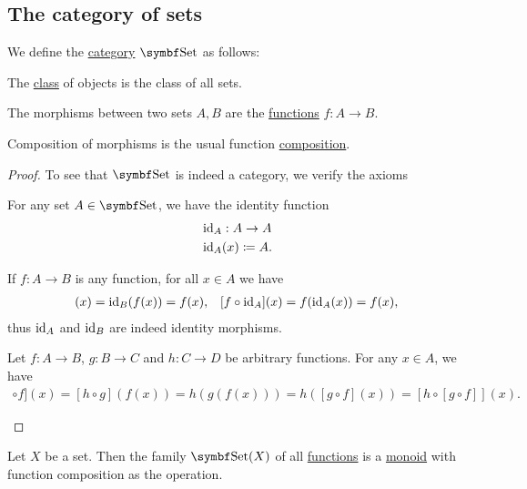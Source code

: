 \subsection{The category of sets}\label{subsec:category_of_sets}

\begin{definition}\label{def:category_of_sets}
  We define the \hyperref[def:category]{category} \( \Cat{Set} \) as follows:
  \begin{description}
     The \hyperref[def:set_zfc]{class} of objects is the class of all sets.

     The morphisms between two sets \( A, B \) are the \hyperref[def:function]{functions} \( f: A \to B \).

     Composition of morphisms is the usual function \hyperref[def:function/composition]{composition}.
  \end{description}
\end{definition}
\begin{proof}
  To see that \( \Cat{Set} \) is indeed a category, we verify the axioms
  \begin{description}
     For any set \( A \in \Cat{Set} \), we have the identity function
    \begin{align*}
      &\operatorname{id}_A: A \to A \\
      &\operatorname{id}_A(x) \coloneqq A.
    \end{align*}

    If \( f: A \to B \) is any function, for all \( x \in A \) we have
    \begin{align*}
      [\Id_B \circ f](x) = \Id_B(f(x)) = f(x),
      &&
      [f \circ \Id_A](x) = f(\Id_A(x)) = f(x),
    \end{align*}
    thus \( \operatorname{id}_A \) and \( \operatorname{id}_B \) are indeed identity morphisms.

     Let \( f: A \to B \), \( g: B \to C \) and \( h: C \to D \) be arbitrary functions. For any \( x \in A \), we have
    \begin{align*}
      [[h \circ g] \circ f](x)
      =
      [h \circ g](f(x))
      =
      h(g(f(x)))
      =
      h([g \circ f](x))
      =
      [h \circ [g \circ f]](x).
    \end{align*}
  \end{description}
\end{proof}

\begin{corollary}\label{thm:functions_over_set_form_monoid}
  Let \( X \) be a set. Then the family \( \Cat{Set}(X) \) of all \hyperref[remark:category_obj_hom]{functions} is a \hyperref[def:magma/monoid]{monoid} with function composition as the operation.
\end{corollary}

